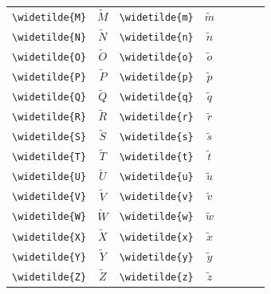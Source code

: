 \documentclass[12pt,a4paper]{article}
\begin{document}
\begin{longtable}{|l|c|l|c|c|l|c|c|}
\verb|\widetilde{M}| & $\widetilde{M}$ & \verb|\widetilde{m}| & $\widetilde{m}$ &                &                      &                 & \\
\verb|\widetilde{N}| & $\widetilde{N}$ & \verb|\widetilde{n}| & $\widetilde{n}$ &                &                      &                 & \\
\verb|\widetilde{O}| & $\widetilde{O}$ & \verb|\widetilde{o}| & $\widetilde{o}$ &                &                      &                 & \\
\verb|\widetilde{P}| & $\widetilde{P}$ & \verb|\widetilde{p}| & $\widetilde{p}$ &                &                      &                 & \\
\verb|\widetilde{Q}| & $\widetilde{Q}$ & \verb|\widetilde{q}| & $\widetilde{q}$ &                &                      &                 & \\
\verb|\widetilde{R}| & $\widetilde{R}$ & \verb|\widetilde{r}| & $\widetilde{r}$ &                &                      &                 & \\
\verb|\widetilde{S}| & $\widetilde{S}$ & \verb|\widetilde{s}| & $\widetilde{s}$ &                &                      &                 & \\
\verb|\widetilde{T}| & $\widetilde{T}$ & \verb|\widetilde{t}| & $\widetilde{t}$ &                &                      &                 & \\
\verb|\widetilde{U}| & $\widetilde{U}$ & \verb|\widetilde{u}| & $\widetilde{u}$ &                &                      &                 & \\
\verb|\widetilde{V}| & $\widetilde{V}$ & \verb|\widetilde{v}| & $\widetilde{v}$ &                &                      &                 & \\
\verb|\widetilde{W}| & $\widetilde{W}$ & \verb|\widetilde{w}| & $\widetilde{w}$ &                &                      &                 & \\
\verb|\widetilde{X}| & $\widetilde{X}$ & \verb|\widetilde{x}| & $\widetilde{x}$ &                &                      &                 & \\
\verb|\widetilde{Y}| & $\widetilde{Y}$ & \verb|\widetilde{y}| & $\widetilde{y}$ &                &                      &                 & \\
\verb|\widetilde{Z}| & $\widetilde{Z}$ & \verb|\widetilde{z}| & $\widetilde{z}$ &                &                      &                 & \\
\hline
\end{longtable}
\end{document}
